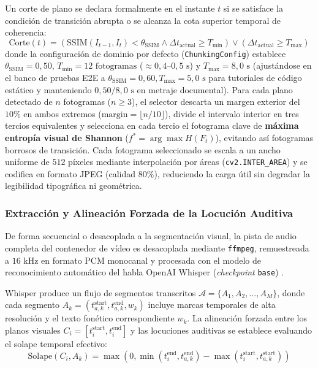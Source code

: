 Un corte de plano se declara formalmente en el instante $t$ si se satisface la condición de transición abrupta o se alcanza la cota superior temporal de coherencia:
\begin{equation}
    \text{Corte}(t) = \left( \text{SSIM}(I_{t-1}, I_t) < \theta_{\text{SSIM}} \land \Delta t_{\text{actual}} \ge T_{\min} \right) \lor \left( \Delta t_{\text{actual}} \ge T_{\max} \right)
\end{equation}
donde la configuración de dominio por defecto (\texttt{ChunkingConfig}) establece $\theta_{\text{SSIM}} = 0,50$, $T_{\min} = 12\text{ fotogramas}$ ($\approx 0,4\text{--}0,5\text{ s}$) y $T_{\max} = 8,0\text{ s}$ (ajustándose en el banco de pruebas E2E a $\theta_{\text{SSIM}} = 0,60, T_{\max} = 5,0\text{ s}$ para tutoriales de código estático y manteniendo $0,50 / 8,0\text{ s}$ en metraje documental). Para cada plano detectado de $n$ fotogramas ($n \ge 3$), el selector descarta un margen exterior del $10\%$ en ambos extremos ($\text{margin} = \lfloor n/10 \rfloor$), divide el intervalo interior en tres tercios equivalentes y selecciona en cada tercio el fotograma clave de \textbf{máxima entropía visual de Shannon} ($f^* = \arg\max H(F_t)$), evitando así fotogramas borrosos de transición. Cada fotograma seleccionado se escala a un ancho uniforme de $512$ píxeles mediante interpolación por áreas (\texttt{cv2.INTER\_AREA}) y se codifica en formato JPEG (calidad $80\%$), reduciendo la carga útil sin degradar la legibilidad tipográfica ni geométrica.

\subsubsection{Extracción y Alineación Forzada de la Locución Auditiva}
De forma secuencial o desacoplada a la segmentación visual, la pista de audio completa del contenedor de vídeo es desacoplada mediante \texttt{ffmpeg}, remuestreada a $16\text{ kHz}$ en formato PCM monocanal y procesada con el modelo de reconocimiento automático del habla OpenAI Whisper (\textit{checkpoint} \texttt{base}) \cite{radford2023whisper}.

Whisper produce un flujo de segmentos transcritos $\mathcal{A} = \{A_1, A_2, \dots, A_M\}$, donde cada segmento $A_k = (t_{a,k}^{\text{start}}, t_{a,k}^{\text{end}}, w_k)$ incluye marcas temporales de alta resolución y el texto fonético correspondiente $w_k$. La alineación forzada entre los planos visuales $C_i = [t_i^{\text{start}}, t_i^{\text{end}}]$ y las locuciones auditivas se establece evaluando el solape temporal efectivo:
\begin{equation}
    \text{Solape}(C_i, A_k) = \max\left(0, \min(t_i^{\text{end}}, t_{a,k}^{\text{end}}) - \max(t_i^{\text{start}}, t_{a,k}^{\text{start}})\right)
\end{equation}


